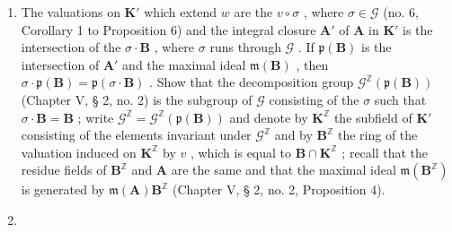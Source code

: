 \begin{enumerate}
\def\labelenumi{(\alph{enumi})}
\item
  The valuations on \(\mathbf{K}'\) which extend \(w\) are the \(v \circ \sigma\) , where \(\sigma \in \mathcal{G}\) (no. 6, Corollary 1 to Proposition 6) and the integral closure \(\mathbf{A}'\) of \(\mathbf{A}\) in \(\mathbf{K}'\) is the intersection of the \(\sigma \cdot \mathbf{B}\) , where \(\sigma\) runs through \(\mathcal{G}\) . If \(\mathfrak{p}(\mathbf{B})\) is the intersection of \(\mathbf{A}'\) and the maximal ideal \(\mathfrak{m}(\mathbf{B})\) , then \(\sigma \cdot \mathfrak{p}(\mathbf{B}) = \mathfrak{p}(\sigma \cdot \mathbf{B})\) . Show that the decomposition group \(\mathcal{G}^{\mathbb{Z}}(\mathfrak{p}(\mathbf{B}))\) (Chapter V, § 2, no. 2) is the subgroup of \(\mathcal{G}\) consisting of the \(\sigma\) such that \(\sigma \cdot \mathbf{B} = \mathbf{B}\) ; write \(\mathcal{G}^{\mathbb{Z}} = \mathcal{G}^{\mathbb{Z}}(\mathfrak{p}(\mathbf{B}))\) and denote by \(\mathbf{K}^{\mathbb{Z}}\) the subfield of \(\mathbf{K}'\) consisting of the elements invariant under \(\mathcal{G}^{\mathbb{Z}}\) and by \(\mathbf{B}^{\mathbb{Z}}\) the ring of the valuation induced on \(\mathbf{K}^{\mathbb{Z}}\) by \(v\) , which is equal to \(\mathbf{B} \cap \mathbf{K}^{\mathbb{Z}}\) ; recall that the residue fields of \(\mathbf{B}^{\mathbb{Z}}\) and \(\mathbf{A}\) are the same and that the maximal ideal \(\mathfrak{m}(\mathbf{B}^{\mathbb{Z}})\) is generated by \(\mathfrak{m}(\mathbf{A})\mathbf{B}^{\mathbb{Z}}\) (Chapter V, § 2, no. 2, Proposition 4).
\item

\end{enumerate}
